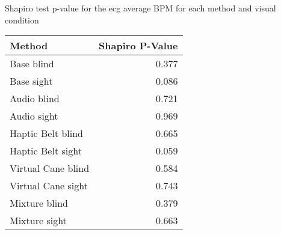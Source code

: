
\centering
\caption{Shapiro test p-value for the ecg average BPM for each method and visual condition}
\label{tab:shapiro_ecg_bpm}
\begin{tabular}{lr}
\toprule
            Method &  Shapiro P-Value \\
\midrule
        Base blind &            0.377 \\
        Base sight &            0.086 \\
       Audio blind &            0.721 \\
       Audio sight &            0.969 \\
 Haptic Belt blind &            0.665 \\
 Haptic Belt sight &            0.059 \\
Virtual Cane blind &            0.584 \\
Virtual Cane sight &            0.743 \\
     Mixture blind &            0.379 \\
     Mixture sight &            0.663 \\
\bottomrule
\end{tabular}
